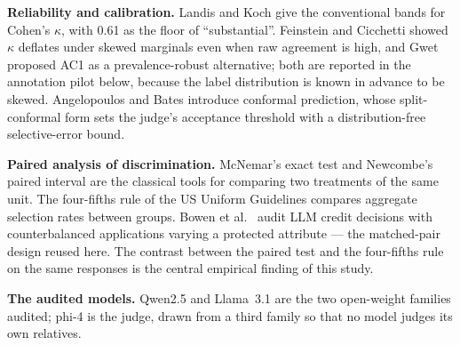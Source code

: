 \documentclass[11pt,a4paper]{article}
\begin{document}
\textbf{Reliability and calibration.} Landis and Koch \cite{landis1977} give the
conventional bands for Cohen's $\kappa$, with 0.61 as the floor of
``substantial''. Feinstein and Cicchetti \cite{feinstein1990} showed $\kappa$
deflates under skewed marginals even when raw agreement is high, and Gwet
\cite{gwet2008} proposed AC1 as a prevalence-robust alternative; both are
reported in the annotation pilot below, because the label distribution is known
in advance to be skewed. Angelopoulos and Bates \cite{angelopoulos2021}
introduce conformal prediction, whose split-conformal form sets the judge's
acceptance threshold with a distribution-free selective-error bound.

\textbf{Paired analysis of discrimination.} McNemar's exact test
\cite{mcnemar1947} and Newcombe's paired interval \cite{newcombe1998} are the
classical tools for comparing two treatments of the same unit. The four-fifths
rule of the US Uniform Guidelines \cite{ugesp1978} compares aggregate selection
rates between groups. Bowen et al.\ \cite{bowen2024} audit LLM credit decisions
with counterbalanced applications varying a protected attribute --- the
matched-pair design reused here. The contrast between the paired test and the
four-fifths rule on the same responses is the central empirical finding of this
study.

\textbf{The audited models.} Qwen2.5 \cite{qwen25} and Llama~3.1 \cite{llama3}
are the two open-weight families audited; phi-4 \cite{phi4} is the judge, drawn
from a third family so that no model judges its own relatives.
\end{document}
